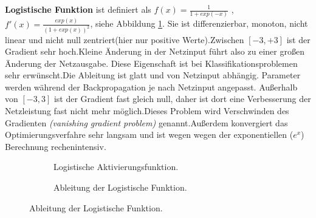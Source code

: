 \documentclass[12pt,a4paper]{scrartcl}
\numberwithin{equation}{section}
\begin{document}
	\textbf{Logistische Funktion} ist definiert als $f(x)=\frac{1}{1+exp(-x)} $ ,$ f'(x)= \frac{exp(x)}{(1+exp(x))^2}$, siehe Abbildung \ref{fig:sigmoid}. Sie ist differenzierbar, monoton, nicht linear und nicht null zentriert(hier nur positive Werte).Zwischen $ [-3,+3] $ ist der Gradient sehr hoch.Kleine Änderung in der Netzinput führt also zu einer großen Änderung der Netzausgabe. Diese Eigenschaft ist bei Klassifikationsproblemen sehr erwünscht.Die Ableitung ist glatt und von Netzinput abhängig. Parameter werden während der Backpropagation je nach Netzinput angepasst.
	Außerhalb von $ [-3,3]  $ ist der Gradient fast gleich null, daher ist dort eine Verbesserung der Netzleistung fast nicht mehr möglich.Dieses Problem wird Verschwinden des Gradienten \textit{(vanishing gradient problem)} genannt.Außerdem konvergiert das Optimierungsverfahre sehr langsam und ist wegen wegen der exponentiellen  ($ e^x $) Berechnung rechenintensiv.
	\begin{figure}[h]
		\caption{Logistische Aktivierungsfunktion:$ sigmoid(x) $.}
		\centering
		\begin{subfigure}{.5\textwidth}	
			\centering	
			\caption{Logistische Aktivierungsfunktion.}
			
		\end{subfigure}%
		\begin{subfigure}{.5\textwidth}	
			\centering	
			\caption{Ableitung der Logistische Funktion.}
		\end{subfigure}
	\label{fig:sigmoid}
		
	\end{figure}
	
\end{document}
